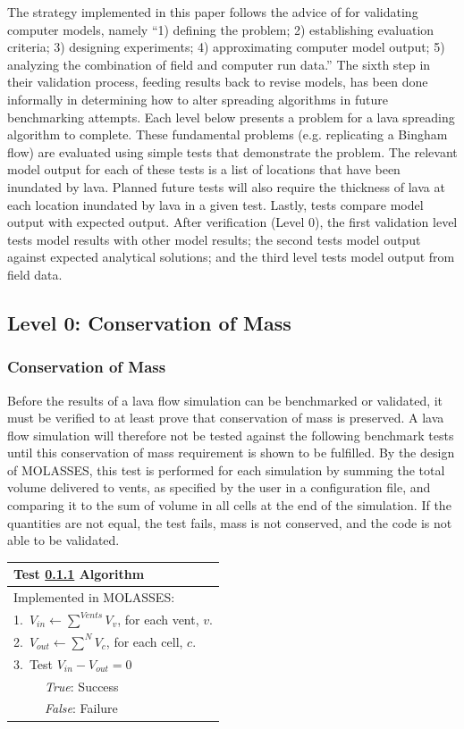 \documentclass[12pt,letter]{article}
\newcommand{\tabitem}{~~\llap{\textbullet}~~}
\newcommand{\tabitem}{~~\llap{\textbullet}~~}
\begin{document}
	The strategy implemented in this paper follows the advice of \citet{bayarri2007framework} for validating computer models, namely ``1) defining the problem; 2) establishing evaluation criteria; 3) designing experiments; 4) approximating computer model output; 5) analyzing the combination of field and computer run data.'' The sixth step in their validation process, feeding results back to revise models, has been done informally in determining how to alter spreading algorithms in future benchmarking attempts. Each level below presents a problem for a lava spreading algorithm to complete. These fundamental problems (e.g. replicating a Bingham flow) are evaluated using simple tests that demonstrate the problem. The relevant model output for each of these tests is a list of locations that have been inundated by lava. Planned future tests will also require the thickness of lava at each location inundated by lava in a given test. Lastly, tests compare model output with expected output. After verification (Level 0), the first validation level tests model results with other model results; the second tests model output against expected analytical solutions; and the third level tests model output from field data.

	\subsection{Level 0: Conservation of Mass}
		\subsubsection{Conservation of Mass}\label{test:CoM}
			Before the results of a lava flow simulation can be benchmarked or validated, it must be verified to at least prove that conservation of mass is preserved. A lava flow simulation will therefore not be tested against the following benchmark tests until this conservation of mass requirement is shown to be fulfilled. By the design of MOLASSES, this test is performed for each simulation by summing the total volume delivered to vents, as specified by the user in a configuration file, and comparing it to the sum of volume in all cells at the end of the simulation. If the quantities are not equal, the test fails, mass is not conserved, and the code is not able to be validated.
	
			\begin{center}
				\begin{tabular}{l}
					\toprule
					\textbf{Test \ref{test:CoM} Algorithm}\\
					\midrule
					Implemented in MOLASSES:\\
					1.~$V_{in}\leftarrow \displaystyle\sum^{Vents} V_{v}$, for each vent, $v$.\\
					2.~$V_{out}\leftarrow \displaystyle\sum^N V_{c}$, for each cell, $c$.\\
					3.~Test $V_{in}-V_{out}=0$\\
					~\tabitem \textit{True}: Success\\
					~\tabitem \textit{False}: Failure\\
					\bottomrule
				\end{tabular}
			\end{center}
\end{document}

